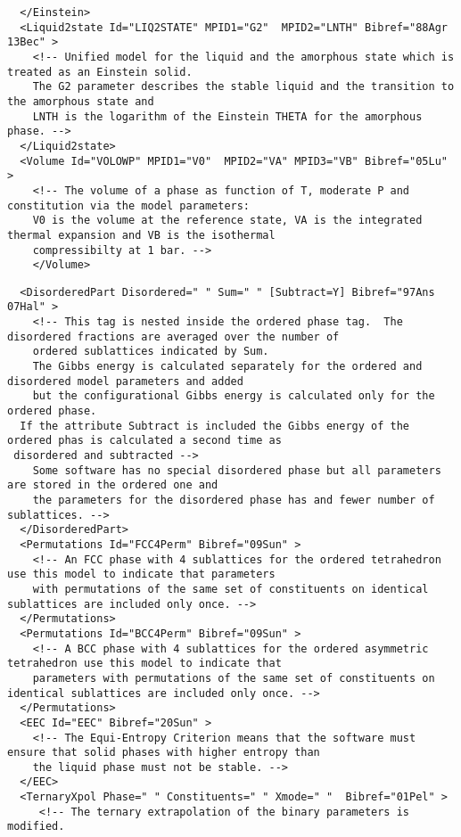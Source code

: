 \documentclass{article}
\begin{document}
\begin{appendices}
{\begin{verbatim}
  </Einstein>
  <Liquid2state Id="LIQ2STATE" MPID1="G2"  MPID2="LNTH" Bibref="88Agr 13Bec" > 
    <!-- Unified model for the liquid and the amorphous state which is treated as an Einstein solid.
    The G2 parameter describes the stable liquid and the transition to the amorphous state and
    LNTH is the logarithm of the Einstein THETA for the amorphous phase. -->
  </Liquid2state>
  <Volume Id="VOLOWP" MPID1="V0"  MPID2="VA" MPID3="VB" Bibref="05Lu" > 
    <!-- The volume of a phase as function of T, moderate P and constitution via the model parameters:
    V0 is the volume at the reference state, VA is the integrated thermal expansion and VB is the isothermal
    compressibilty at 1 bar. -->
    </Volume>
\end{verbatim}

\newpage

\begin{verbatim}
  <DisorderedPart Disordered=" " Sum=" " [Subtract=Y] Bibref="97Ans 07Hal" > 
    <!-- This tag is nested inside the ordered phase tag.  The disordered fractions are averaged over the number of
    ordered sublattices indicated by Sum.
    The Gibbs energy is calculated separately for the ordered and disordered model parameters and added 
    but the configurational Gibbs energy is calculated only for the ordered phase.
  If the attribute Subtract is included the Gibbs energy of the ordered phas is calculated a second time as
 disordered and subtracted -->
    Some software has no special disordered phase but all parameters are stored in the ordered one and
    the parameters for the disordered phase has and fewer number of sublattices. -->
  </DisorderedPart>
  <Permutations Id="FCC4Perm" Bibref="09Sun" > 
    <!-- An FCC phase with 4 sublattices for the ordered tetrahedron use this model to indicate that parameters 
    with permutations of the same set of constituents on identical sublattices are included only once. -->
  </Permutations>
  <Permutations Id="BCC4Perm" Bibref="09Sun" > 
    <!-- A BCC phase with 4 sublattices for the ordered asymmetric tetrahedron use this model to indicate that
    parameters with permutations of the same set of constituents on identical sublattices are included only once. -->
  </Permutations>
  <EEC Id="EEC" Bibref="20Sun" > 
    <!-- The Equi-Entropy Criterion means that the software must ensure that solid phases with higher entropy than
    the liquid phase must not be stable. -->
  </EEC>
  <TernaryXpol Phase=" " Constituents=" " Xmode=" "  Bibref="01Pel" > 
     <!-- The ternary extrapolation of the binary parameters is modified.

\end{verbatim}}
\end{appendices}
\end{document}
